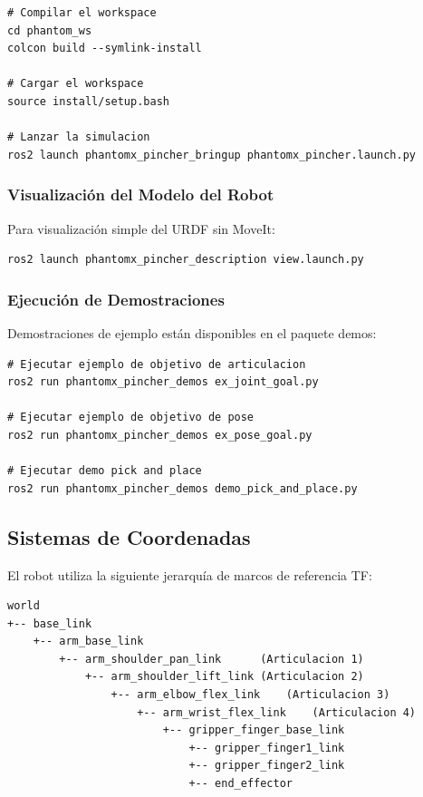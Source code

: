 \begin{verbatim}
# Compilar el workspace
cd phantom_ws
colcon build --symlink-install

# Cargar el workspace
source install/setup.bash

# Lanzar la simulacion
ros2 launch phantomx_pincher_bringup phantomx_pincher.launch.py
\end{verbatim}

\subsubsection{Visualización del Modelo del Robot}

Para visualización simple del URDF sin MoveIt:

\begin{verbatim}
ros2 launch phantomx_pincher_description view.launch.py
\end{verbatim}

\subsubsection{Ejecución de Demostraciones}

Demostraciones de ejemplo están disponibles en el paquete demos:

\begin{verbatim}
# Ejecutar ejemplo de objetivo de articulacion
ros2 run phantomx_pincher_demos ex_joint_goal.py

# Ejecutar ejemplo de objetivo de pose
ros2 run phantomx_pincher_demos ex_pose_goal.py

# Ejecutar demo pick and place
ros2 run phantomx_pincher_demos demo_pick_and_place.py
\end{verbatim}

\subsection{Sistemas de Coordenadas}

El robot utiliza la siguiente jerarquía de marcos de referencia TF:

\begin{verbatim}
world
+-- base_link
    +-- arm_base_link
        +-- arm_shoulder_pan_link      (Articulacion 1)
            +-- arm_shoulder_lift_link (Articulacion 2)
                +-- arm_elbow_flex_link    (Articulacion 3)
                    +-- arm_wrist_flex_link    (Articulacion 4)
                        +-- gripper_finger_base_link
                            +-- gripper_finger1_link
                            +-- gripper_finger2_link
                            +-- end_effector
\end{verbatim}

